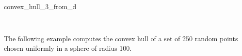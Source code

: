 \begin{ccRefFunction}{convex_hull_3_from_d}
\ccSeeAlso

 \\

\ccExample

The following example computes the convex hull of a set of 250 random 
points chosen uniformly in a sphere of radius 100.


\end{ccRefFunction}


